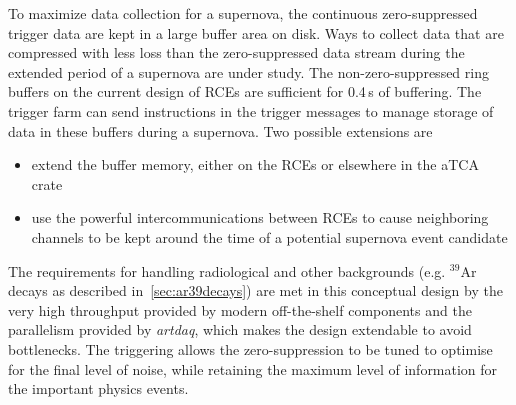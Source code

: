 To maximize data collection for a supernova, the continuous
zero-suppressed trigger data are kept in a large buffer area on disk.
Ways to collect data that are compressed with less loss than the zero-suppressed 
data stream during the extended period of a supernova are
under study.  The non-zero-suppressed ring buffers on the current
design of RCEs are sufficient for 0.4\,s of buffering. The trigger farm can send
instructions in the trigger messages to manage storage of data in
these buffers during a supernova. Two possible extensions are

\begin{itemize}
\item extend the buffer memory, either on the RCEs or elsewhere in the aTCA crate

\item use the powerful intercommunications between RCEs to cause neighboring
channels to be kept around the time of a potential supernova event candidate

\end{itemize}


\noindent
The requirements for handling radiological and other backgrounds (e.g. $^{39}$Ar decays as described
in~\ref{sec:ar39decays}) are met in this conceptual design by the very high throughput provided by modern
off-the-shelf components  and the parallelism provided by \textit{artdaq}, which makes the design extendable to avoid bottlenecks.  The triggering
allows the zero-suppression to be tuned to optimise for the final
level of noise, while retaining the maximum level of information for
the important physics events.


